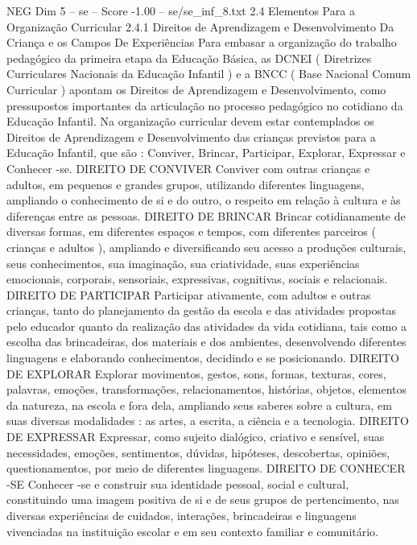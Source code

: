 \begin{textsample}{NEG Dim 5 – se – Score -1.00 – se/se\_inf\_8.txt}  \label{ex:f5_neg_152}
2.4 Elementos Para a Organização Curricular 2.4.1 Direitos de Aprendizagem e Desenvolvimento Da Criança e os Campos De Experiências Para embasar a organização do trabalho pedagógico da primeira etapa da Educação Básica, as DCNEI ( Diretrizes Curriculares Nacionais da Educação Infantil ) e a BNCC ( Base Nacional Comum Curricular ) apontam os Direitos de Aprendizagem e Desenvolvimento, como pressupostos importantes da articulação no processo pedagógico no cotidiano da Educação Infantil.
Na organização curricular devem estar contemplados os Direitos de Aprendizagem e Desenvolvimento das crianças previstos para a Educação Infantil, que são : Conviver, Brincar, Participar, Explorar, Expressar e Conhecer -se.
DIREITO DE CONVIVER Conviver com outras crianças e adultos, em pequenos e grandes grupos, utilizando diferentes linguagens, ampliando o conhecimento de si e do outro, o respeito em relação à cultura e às diferenças entre as pessoas.
DIREITO DE BRINCAR Brincar cotidianamente de diversas formas, em diferentes espaços e tempos, com diferentes parceiros ( crianças e adultos ), ampliando e diversificando seu acesso a produções culturais, seus conhecimentos, sua imaginação, sua criatividade, suas experiências emocionais, corporais, sensoriais, expressivas, cognitivas, sociais e relacionais.
DIREITO DE PARTICIPAR Participar ativamente, com adultos e outras crianças, tanto do planejamento da gestão da escola e das atividades propostas pelo educador quanto da realização das atividades da vida cotidiana, tais como a escolha das brincadeiras, dos materiais e dos ambientes, desenvolvendo diferentes linguagens e elaborando conhecimentos, decidindo e se posicionando.
DIREITO DE EXPLORAR Explorar movimentos, gestos, sons, formas, texturas, cores, palavras, emoções, transformações, relacionamentos, histórias, objetos, elementos da natureza, na escola e fora dela, ampliando seus saberes sobre a cultura, em suas diversas modalidades : as artes, a escrita, a ciência e a tecnologia.
DIREITO DE EXPRESSAR Expressar, como sujeito dialógico, criativo e sensível, suas necessidades, emoções, sentimentos, dúvidas, hipóteses, descobertas, opiniões, questionamentos, por meio de diferentes linguagens.
DIREITO DE CONHECER -SE Conhecer -se e construir sua identidade pessoal, social e cultural, constituindo uma imagem positiva de si e de seus grupos de pertencimento, nas diversas experiências de cuidados, interações, brincadeiras e linguagens vivenciadas na instituição escolar e em seu contexto familiar e comunitário.

\end{textsample}
